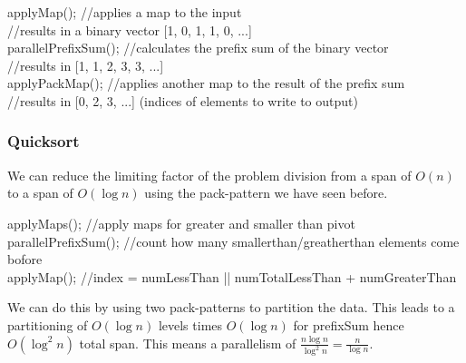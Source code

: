             \begin{algorithm}

                applyMap(); //applies a map to the input\\

                //results in a binary vector [1, 0, 1, 1, 0, ...]\\

                parallelPrefixSum(); //calculates the prefix sum of the binary vector\\

                //results in [1, 1, 2, 3, 3, ...]\\

                applyPackMap(); //applies another map to the result of the prefix sum\\

                //results in [0, 2, 3, ...] (indices of elements to write to output)
            
\end{algorithm}

\subsubsection{Quicksort}

            We can reduce the limiting factor of the problem division from a span of $O(n)$ to a span of $O(\log n)$
            using the pack-pattern we have seen before.

            \begin{algorithm}

                applyMaps(); //apply maps for greater and smaller than pivot\\

                parallelPrefixSum(); //count how many smallerthan/greatherthan elements come bofore\\

                applyMap(); //index = numLessThan || numTotalLessThan + numGreaterThan
            
\end{algorithm}

            We can do this by using two pack-patterns to partition the data. This leads to a partitioning of $O(\log n)$
            levels times $O(\log n)$ for prefixSum hence $O(\log^2 n)$ total span. This means a parallelism of $\frac{n
            \log n}{\log^2 n} = \frac{n}{\log n}$.

        